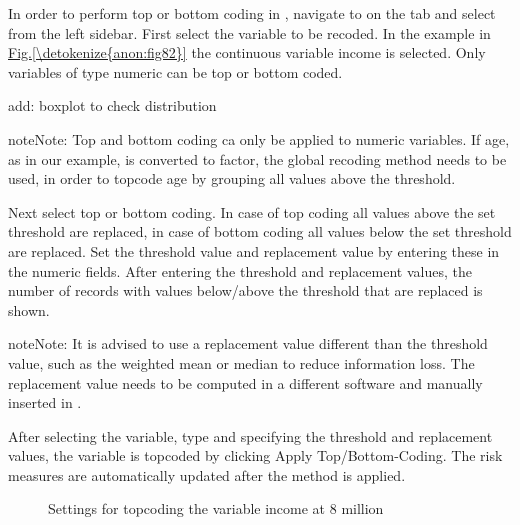 \documentclass[letterpaper,10pt,english]{sphinxmanual}
\begin{document}
In order to perform top or bottom coding in , navigate to on the 
tab and select  from the left sidebar. First select the variable
to be recoded. In the example in \hyperref[\detokenize{anon:fig82}]{Fig.\@ \ref{\detokenize{anon:fig82}}} the continuous variable income
is selected. Only variables of type numeric can be top or bottom coded.

add: boxplot to check distribution

\begin{sphinxadmonition}{note}{Note:}
Top and bottom coding ca only be applied to numeric variables. If age, as in our example,
is converted to factor, the global recoding method needs to be used, in order to
topcode age by grouping all values above the threshold.
\end{sphinxadmonition}

Next select top or bottom coding. In case of top coding all values above the set threshold
are replaced, in case of bottom coding all values below the set threshold are replaced.
Set the threshold value and replacement value by entering these in the numeric fields.
After entering the threshold and replacement values, the number of records with values
below/above the threshold that are replaced is shown.

\begin{sphinxadmonition}{note}{Note:}
It is advised to use a replacement value different than the threshold value,
such as the weighted mean or median to reduce information loss. The replacement
value needs to be computed in a different software and manually inserted in .
\end{sphinxadmonition}

After selecting the variable, type and specifying the threshold and replacement values,
the variable is topcoded by clicking Apply Top/Bottom-Coding. The risk measures are
automatically updated after the method is applied.

\begin{figure}[htbp]
\centering
\capstart

\noindent{}
\caption{Settings for topcoding the variable income at 8 million}\label{\detokenize{anon:fig82}}\label{\detokenize{anon:id2}}\end{figure}
\end{document}

